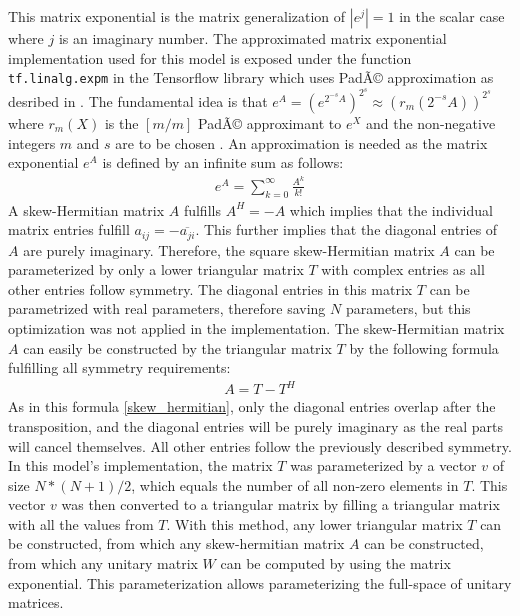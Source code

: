 \documentclass[draft,final]{vutinfth} %
\begin{document}
    This matrix exponential is the matrix generalization of $|e^j|=1$ in the scalar case where $j$ is an imaginary number.
    The approximated matrix exponential implementation used for this model is exposed under the function \texttt{tf.linalg.expm} in the Tensorflow library \cite{Tensorflow} which uses PadÃ© approximation as desribed in \cite{expm}.
    The fundamental idea is that $e^A = (e^{2^{-s}A})^{2^s} \approx (r_m(2^{-s}A))^{2^s}$ where $r_m(X)$ is the $[m/m]$ PadÃ© approximant to $e^X$ and the non-negative integers $m$ and $s$ are to be chosen \cite[p. 1]{expm}.
    An approximation is needed as the matrix exponential $e^A$ is defined by an infinite sum as follows:
    \begin{align}
        \label{expm_definition}
        e^A = \sum_{k=0}^{\infty} \frac{A^k}{k!}
    \end{align}
    A skew-Hermitian matrix $A$ fulfills $A^H = -A$ which implies that the individual matrix entries fulfill $a_{ij} = -\overline{a_{ji}}$.
    This further implies that the diagonal entries of $A$ are purely imaginary.
    Therefore, the square skew-Hermitian matrix $A$ can be parameterized by only a lower triangular matrix $T$ with complex entries as all other entries follow symmetry.
    The diagonal entries in this matrix $T$ can be parametrized with real parameters, therefore saving $N$ parameters, but this optimization was not applied in the implementation.
    The skew-Hermitian matrix $A$ can easily be constructed by the triangular matrix $T$ by the following formula fulfilling all symmetry requirements:
    \begin{align}
        \label{skew_hermitian}
        A = T - T^H
    \end{align}
    As in this formula \ref{skew_hermitian}, only the diagonal entries overlap after the transposition, and the diagonal entries will be purely imaginary as the real parts will cancel themselves.
    All other entries follow the previously described symmetry.
    In this model's implementation, the matrix $T$ was parameterized by a vector $v$ of size $N*(N+1)/2$, which equals the number of all non-zero elements in $T$.
    This vector $v$ was then converted to a triangular matrix by filling a triangular matrix with all the values from $T$.
    With this method, any lower triangular matrix $T$ can be constructed, from which any skew-hermitian matrix $A$ can be constructed, from which any unitary matrix $W$ can be computed by using the matrix exponential.
    This parameterization allows parameterizing the full-space of unitary matrices.
\end{document}
